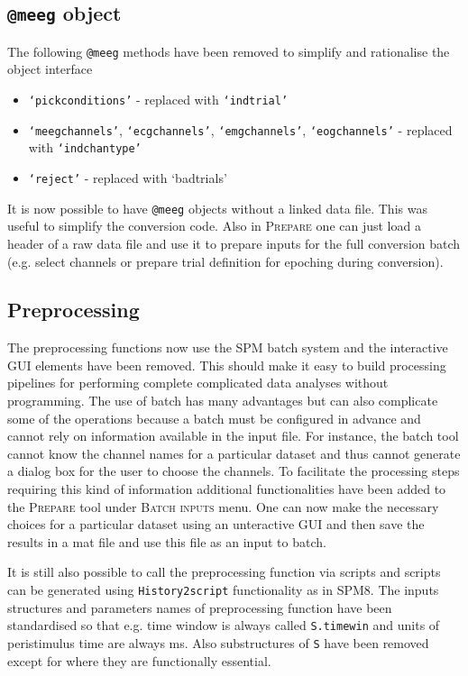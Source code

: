 \documentclass[a4paper,titlepage,openany]{article}
\begin{document}
\begin{multicols}{2}
\subsection{\texttt{@meeg} object}

The following \texttt{@meeg} methods have been removed to simplify and rationalise the object interface
\begin{itemize}
\item \texttt{`pickconditions'} - replaced with \texttt{`indtrial'}
\item \texttt{`meegchannels'}, \texttt{`ecgchannels'}, \texttt{`emgchannels'},  \texttt{`eogchannels'} - replaced with \texttt{`indchantype'}
\item \texttt{`reject'} - replaced with {`badtrials'}
\end{itemize}

It is now possible to have \texttt{@meeg} objects without a linked data file. This was useful to simplify the conversion code. Also in \textsc{Prepare} one can just load a header of a raw data file and use it to prepare inputs for the full conversion batch (e.g. select channels or prepare trial definition for epoching during conversion).

\subsection{Preprocessing}

The preprocessing functions now use the SPM batch system and the interactive GUI elements have been removed. This should make it easy to build processing pipelines for performing complete complicated data analyses without programming. The use of batch has many advantages but can also complicate some of the operations because a batch must be configured in advance and cannot rely on information available in the input file. For instance, the batch tool cannot know the channel names for a particular dataset and thus cannot generate a dialog box for the user to choose the channels. To facilitate the processing steps requiring this kind of information additional functionalities have been added to the \textsc{Prepare} tool under \textsc{Batch inputs} menu. One can now make the necessary choices for a particular dataset using an unteractive GUI and then save the results in a mat file and use this file as an input to batch.

It is still also possible to call the preprocessing function via scripts and scripts can be generated using \texttt{History2script} functionality as in SPM8. The inputs structures and parameters names of preprocessing function have been standardised so that e.g. time window is always called \texttt{S.timewin} and units of peristimulus time are always ms. Also substructures of \texttt{S} have been removed except for where they are functionally essential.


\end{multicols}
\end{document}
